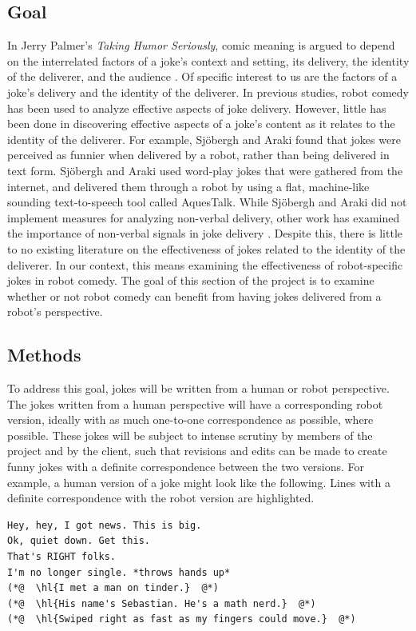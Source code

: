 \documentclass[onecolumn, draftclsnofoot,10pt, compsoc]{IEEEtran}
\begin{document}
\subsection{Goal}
In Jerry Palmer's \textit{Taking Humor Seriously}, comic meaning is argued to depend on the interrelated factors of a joke's context and setting, its delivery, the identity of the deliverer, and the audience \cite{Palmer:1993}.
Of specific interest to us are the factors of a joke's delivery and the identity of the deliverer.
In previous studies, robot comedy has been used to analyze effective aspects of joke delivery.
However, little has been done in discovering effective aspects of a joke's content as it relates to the identity of the deliverer.
For example, Sj\"{o}bergh and Araki \cite{RobotsMakeThings:2008} found that jokes were perceived as funnier when delivered by a robot, rather than being delivered in text form.
Sj\"{o}bergh and Araki used word-play jokes that were gathered from the internet, and delivered them through a robot by using a flat, machine-like sounding text-to-speech tool called AquesTalk.
While Sj\"{o}bergh and Araki did not implement measures for analyzing non-verbal delivery, other work has examined the importance of non-verbal signals in joke delivery \cite{KatevasRobot:2014} \cite{KnightEightLessons:2011}.
Despite this, there is little to no existing literature on the effectiveness of jokes related to the identity of the deliverer.
In our context, this means examining the effectiveness of robot-specific jokes in robot comedy.
The goal of this section of the project is to examine whether or not robot comedy can benefit from having jokes delivered from a robot's perspective.

\subsection{Methods}
To address this goal, jokes will be written from a human or robot perspective.
The jokes written from a human perspective will have a corresponding robot version, ideally with as much one-to-one correspondence as possible, where possible.
These jokes will be subject to intense scrutiny by members of the project and by the client, such that revisions and edits can be made to create funny jokes with a definite correspondence between the two versions.
For example, a human version of a joke might look like the following. Lines with a definite correspondence with the robot version are highlighted.

\begin{lstlisting}
Hey, hey, I got news. This is big.
Ok, quiet down. Get this.
That's RIGHT folks.
I'm no longer single. *throws hands up*
(*@  \hl{I met a man on tinder.}  @*)
(*@  \hl{His name's Sebastian. He's a math nerd.}  @*)
(*@  \hl{Swiped right as fast as my fingers could move.}  @*)
\end{lstlisting}
\end{document}
